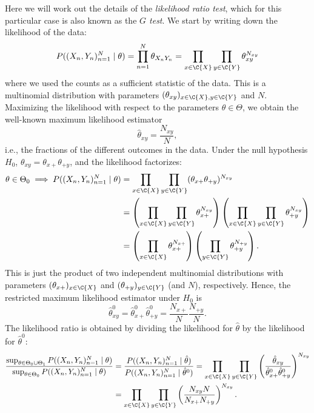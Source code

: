 Here we will work out the details of the \emph{likelihood ratio test}, which for this particular case
is also known as the \emph{$G$ test}. We start by writing down the likelihood of the data:
$$P((X_n,Y_n)_{n=1}^N \mid \theta) = \prod_{n=1}^N \theta_{X_nY_n} = \prod_{x\in\C{X}} \prod_{y\in\C{Y}} \theta_{xy}^{N_{xy}}$$
where we used the counts as a sufficient statistic of the data. 
This is a multinomial distribution with parameters $(\theta_{xy})_{x\in\C{X},y\in\C{Y}}$ and $N$.
Maximizing the likelihood with respect to the parameters $\theta \in \Theta$, we obtain the well-known maximum likelihood estimator
$$\hat \theta_{xy} = \frac{N_{xy}}{N},$$
i.e., the fractions of the different outcomes in the data.
Under the null hypothesis $H_0$, $\theta_{xy} = \theta_{x+}\theta_{+ y}$, and the likelihood factorizes:
\begin{equation*}\begin{split}
  \theta \in \Theta_0 \implies P((X_n,Y_n)_{n=1}^N \mid \theta) 
  &= \prod_{x\in\C{X}} \prod_{y\in\C{Y}} (\theta_{x+} \theta_{+ y})^{N_{xy}} \\
  &= \left(\prod_{x\in\C{X}} \prod_{y\in\C{Y}} \theta_{x+}^{N_{xy}} \right) \left(\prod_{x\in\C{X}} \prod_{y\in\C{Y}} \theta_{+ y}^{N_{xy}}\right) \\
  &= \left(\prod_{x\in\C{X}} \theta_{x+}^{N_{x+}} \right) \left(\prod_{y\in\C{Y}} \theta_{+ y}^{N_{+ y}}\right).
\end{split}\end{equation*}
This is just the product of two independent multinomial distributions with parameters
$(\theta_{x+})_{x\in\C{X}}$ and $(\theta_{+ y})_{y\in\C{Y}}$ (and $N$), respectively.
Hence, the restricted maximum likelihood estimator under $H_0$ is 
$$\hat \theta^0_{xy} = \hat \theta^0_{x+} \hat \theta^0_{+ y} = \frac{N_{x+}}{N} \frac{N_{+ y}}{N}.$$
The likelihood ratio is obtained by dividing the likelihood for $\hat \theta$ by the likelihood for $\hat \theta^0$:
\begin{equation}\label{eq:indep_test_XY_likelihood_ratio}\begin{split}
\frac{\sup_{\theta\in\Theta_0\cup\Theta_1} P((X_n,Y_n)_{n=1}^N \mid \theta)}{\sup_{\theta\in\Theta_0} P((X_n,Y_n)_{n=1}^N \mid \theta)}
  & = \frac{P((X_n,Y_n)_{n=1}^N \mid \hat\theta)}{P((X_n,Y_n)_{n=1}^N \mid \hat\theta^0)}
    = \prod_{x\in\C{X}} \prod_{y\in\C{Y}} \left(\frac{\hat \theta_{xy}}{\hat \theta^0_{x+} \hat \theta^0_{+ y}}\right)^{N_{xy}} \\
  & = \prod_{x\in\C{X}} \prod_{y\in\C{Y}} \left(\frac{N_{xy} N}{N_{x+} N_{+ y}}\right)^{N_{xy}}.
\end{split}\end{equation}
